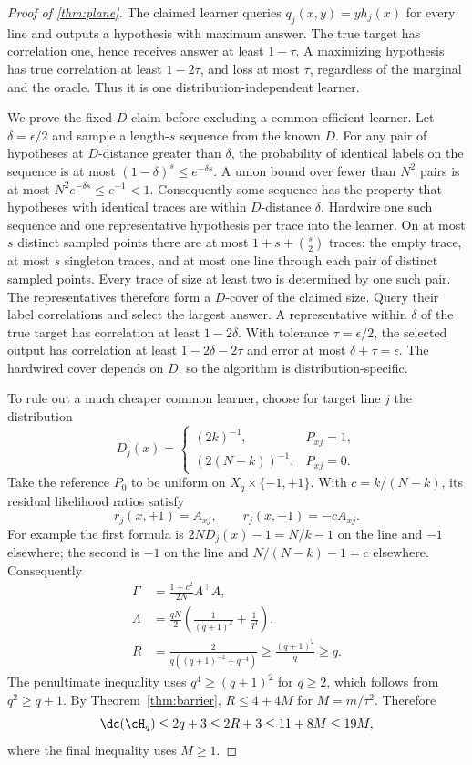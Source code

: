 \begin{proof}[Proof of \cref{thm:plane}]
The claimed learner queries $q_j(x,y)=y h_j(x)$ for every line and outputs a hypothesis with maximum answer. The true target has correlation one, hence receives answer at least $1-\tau$. A maximizing hypothesis has true correlation at least $1-2\tau$, and loss at most $\tau$, regardless of the marginal and the oracle. Thus it is one distribution-independent learner.

We prove the fixed-$D$ claim before excluding a common efficient learner. Let $\delta=\epsilon/2$ and sample a length-$s$ sequence from the known $D$. For any pair of hypotheses at $D$-distance greater than $\delta$, the probability of identical labels on the sequence is at most $(1-\delta)^s\leq e^{-\delta s}$. A union bound over fewer than $N^2$ pairs is at most $N^2e^{-\delta s}\leq e^{-1}<1$. Consequently some sequence has the property that hypotheses with identical traces are within $D$-distance $\delta$. Hardwire one such sequence and one representative hypothesis per trace into the learner. On at most $s$ distinct sampled points there are at most $1+s+\binom{s}{2}$ traces: the empty trace, at most $s$ singleton traces, and at most one line through each pair of distinct sampled points. Every trace of size at least two is determined by one such pair. The representatives therefore form a $D$-cover of the claimed size. Query their label correlations and select the largest answer. A representative within $\delta$ of the true target has correlation at least $1-2\delta$. With tolerance $\tau=\epsilon/2$, the selected output has correlation at least $1-2\delta-2\tau$ and error at most $\delta+\tau=\epsilon$. The hardwired cover depends on $D$, so the algorithm is distribution-specific.

To rule out a much cheaper common learner, choose for target line $j$ the distribution
\[
 D_j(x)=\begin{cases}(2k)^{-1},&P_{xj}=1,\\[1mm]
 (2(N-k))^{-1},&P_{xj}=0.
 \end{cases}
\]
Take the reference $P_0$ to be uniform on $X_q\times\{-1,+1\}$. With $c=k/(N-k)$, its residual likelihood ratios satisfy
\[
 r_j(x,+1)=A_{xj},\qquad r_j(x,-1)=-cA_{xj}.
\]
For example the first formula is $2N D_j(x)-1=N/k-1$ on the line and $-1$ elsewhere; the second is $-1$ on the line and $N/(N-k)-1=c$ elsewhere. Consequently
\begin{align*}
 \Gamma&=\frac{1+c^2}{2N}A^\top A,\\
 \Lambda&=\frac{qN}{2}\left(\frac1{(q+1)^2}+\frac1{q^4}\right),\\
 R&=\frac{2}{q((q+1)^{-2}+q^{-4})}\geq\frac{(q+1)^2}{q}\geq q.
\end{align*}
The penultimate inequality uses $q^4\geq(q+1)^2$ for $q\geq2$, which follows from $q^2\geq q+1$. By Theorem~\ref{thm:barrier}, $R\leq4+4M$ for $M=m/\tau^2$. Therefore
\[
 \dc(\cH_q)\leq2q+3\leq2R+3\leq11+8M\leq19M,
\]
where the final inequality uses $M\geq1$.
\end{proof}
